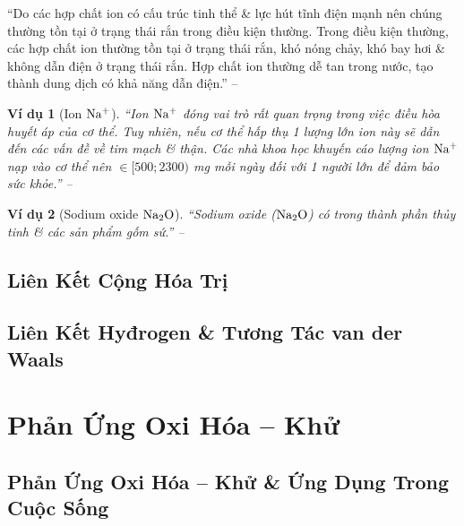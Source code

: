 \documentclass[oneside]{book}
\numberwithin{equation}{section}
\newtheorem{vidu}{Ví dụ}[section]
\begin{document}
``Do các hợp chất ion có cấu trúc tinh thể \& lực hút tĩnh điện mạnh nên chúng thường tồn tại ở trạng thái rắn trong điều kiện thường. Trong điều kiện thường, các hợp chất ion thường tồn tại ở trạng thái rắn, khó nóng chảy, khó bay hơi \& không dẫn điện ở trạng thái rắn. Hợp chất ion thường dễ tan trong nước, tạo thành dung dịch có khả năng dẫn điện.'' -- \cite[p. 57]{SGK_Hoa_Hoc_10_Chan_Troi_Sang_Tao}

\begin{vidu}[Ion $\rm Na^+$]
	``Ion $\rm Na^+$ đóng vai trò rất quan trọng trong việc điều hòa huyết áp của cơ thể. Tuy nhiên, nếu cơ thể hấp thụ 1 lượng lớn ion này sẽ dẫn đến các vấn đề về tim mạch \& thận. Các nhà khoa học khuyến cáo lượng ion $\rm Na^+$ nạp vào cơ thể nên $\in[500;2300)$ mg mỗi ngày đối với 1 người lớn để đảm bảo sức khỏe.'' -- \cite[p. 57]{SGK_Hoa_Hoc_10_Chan_Troi_Sang_Tao}
\end{vidu}

\begin{vidu}[Sodium oxide $\rm Na_2O$]
	``\emph{Sodium oxide ($\rm Na_2O$)} có trong thành phần thủy tinh \& các sản phẩm gốm sứ.'' -- \cite[p. 58]{SGK_Hoa_Hoc_10_Chan_Troi_Sang_Tao}
\end{vidu}


\section{Liên Kết Cộng Hóa Trị}


\section{Liên Kết Hyđrogen \& Tương Tác van der Waals}


\chapter{Phản Ứng Oxi Hóa -- Khử}

\section{Phản Ứng Oxi Hóa -- Khử \& Ứng Dụng Trong Cuộc Sống}
\end{document}
